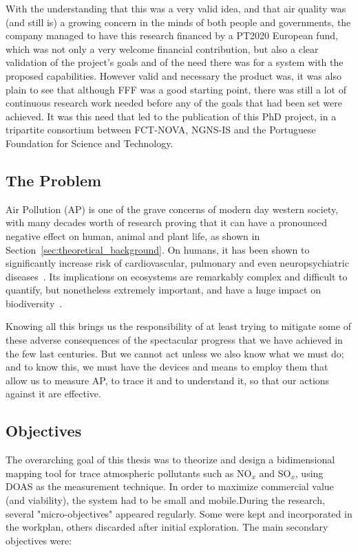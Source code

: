 With the understanding that this was a very valid idea, and that air
quality was (and still is) a growing concern in the minds of both people
and governments, the company managed to have this research financed by
a PT2020 European fund, which was not only a very welcome financial
contribution, but also a clear validation of the project's goals and of
the need there was for a system with the proposed capabilities. However
valid and necessary the product was, it was also plain to see that
although \gls{FFF} was a good starting point, there was still a lot of
continuous research work needed before any of the goals that had been
set were achieved. It was this need that led to the publication of this
PhD project, in a tripartite consortium between FCT-NOVA, NGNS-IS and
the Portuguese Foundation for Science and Technology.

\subsection{The Problem}%
\label{sub:the_problem}

Air Pollution (\gls{AP}) is one of the grave concerns of modern day
western society, with many decades worth of research proving that it can
have a pronounced negative effect on human, animal and plant life, as
shown in Section~\ref{sec:theoretical_background}. On humans, it has
been shown to significantly increase risk of cardiovascular, pulmonary
and even neuropsychiatric diseases~\cite{Carugno2016, Ghorani-Azam2016,
Kampa2008}. Its implications on ecosystems are remarkably complex and
difficult to quantify, but nonetheless extremely important, and have a
huge impact on biodiversity~\cite{Lovett2009}.

Knowing all this brings us the responsibility of at least trying to
mitigate some of these adverse consequences of the spectacular progress
that we have achieved in the few last centuries. But we cannot act
unless we also know what we must do; and to know this, we must have
the devices and means to employ them that allow us to measure \gls{AP},
to trace it and to understand it, so that our actions against it are
effective.

\subsection{Objectives}%
\label{sub:objectives}

The overarching goal of this thesis was to theorize and design a
bidimensional mapping tool for trace atmospheric pollutants such as
NO$_x$ and SO$_x$, using DOAS as the measurement technique. In order to
maximize commercial value (and viability), the system had to be small
and mobile.During the research, several "micro-objectives" appeared
regularly. Some were kept and incorporated in the workplan, others
discarded after initial exploration. The main secondary objectives were:

